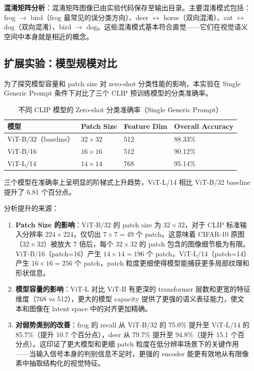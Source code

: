 \documentclass[12pt,a4paper]{ctexart}
\begin{document}
\textbf{混淆矩阵分析}：混淆矩阵图像已由实验代码保存至输出目录。主要混淆模式包括：frog $\to$ bird（frog 最常见的误分类方向）、deer $\leftrightarrow$ horse（双向混淆）、cat $\leftrightarrow$ dog（双向混淆）、bird $\to$ dog。这些混淆模式基本符合直觉——它们在视觉语义空间中本身就是相近的概念。

\subsection{扩展实验：模型规模对比}

为了探究模型容量和 patch size 对 zero-shot 分类性能的影响，本实验在 Single Generic Prompt 条件下对比了三个 CLIP 预训练模型的分类准确率。

\begin{table}[H]
\centering
\caption{不同 CLIP 模型的 Zero-shot 分类准确率（Single Generic Prompt）}
\label{tab:model-comparison}
\begin{tabular}{llll}
\toprule
模型 & Patch Size & Feature Dim & Overall Accuracy \\
\midrule
ViT-B/32（baseline）& $32\times32$ & 512 & 88.33\% \\
ViT-B/16            & $16\times16$ & 512 & 90.12\% \\
ViT-L/14            & $14\times14$ & 768 & 95.14\% \\
\bottomrule
\end{tabular}
\end{table}

三个模型在准确率上呈明显的阶梯式上升趋势，ViT-L/14 相比 ViT-B/32 baseline 提升了 6.81 个百分点。

分析提升的来源：

\begin{enumerate}
    \item \textbf{Patch Size 的影响}：ViT-B/32 的 patch size 为 $32\times32$，对于 CLIP 标准输入分辨率 $224\times224$，仅切出 $7\times7=49$ 个 patch。这意味着 CIFAR-10 原图（$32\times32$）被放大 7 倍后，每个 $32\times32$ 的 patch 包含的图像细节极为有限。ViT-B/16（patch=16）产生 $14\times14=196$ 个 patch，ViT-L/14（patch=14）产生 $16\times16=256$ 个 patch，patch 粒度更细使得模型能捕获更多局部纹理和形状信息。
    \item \textbf{模型容量的影响}：ViT-L 对比 ViT-B 有更深的 transformer 层数和更宽的特征维度（768 vs 512），更大的模型 capacity 提供了更强的语义表征能力，使文本和图像在 latent space 中的对齐更加精确。
    \item \textbf{对弱势类别的改善}：frog 的 recall 从 ViT-B/32 的 75.0\% 提升至 ViT-L/14 的 85.7\%（提升 10.7 个百分点），deer 从 79.7\% 提升至 94.8\%（提升 15.1 个百分点）。这印证了更大模型和更细 patch 粒度在低分辨率场景下的关键作用——当输入信号本身的判别信息不足时，更强的 encoder 能更有效地从有限像素中抽取结构化的视觉特征。
\end{enumerate}
\end{document}
